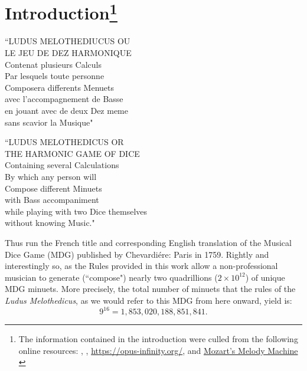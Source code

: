 \documentclass[a4paper,x11names,svgnames,10pt]{article}
\begin{document}
{\section[Introduction]{Introduction\footnote{The information contained in the introduction were culled from the following online resources:
	\citet{ac1802}, 
	\citet{wiki_mw2017},
	\url{https://opus-infinity.org/}, and 
	\href{https://www.sciencenews.org/article/mozarts-melody-machine-0}{Mozart's Melody Machine} \citep*{peterson2001}
	}
}
	\begin{center}
	\begin{minipage}{0.4\textwidth}
	\begin{flushleft}
		\begin{center}
			``\small LUDUS MELOTHEDIUCUS OU \\ LE JEU DE DEZ HARMONIQUE \\
			Contenat plusieurs Calculs \\
			Par lesquels toute personne \\ Composera differents Menuets \\ 
			avec l'accompagnement de Basse  \\
			en jouant avec de deux Dez meme  \\
			sans scavior la Musique"
		\end{center}
	\end{flushleft}
	\end{minipage}
	\begin{minipage}{0.4\textwidth}
	\begin{flushright}
		\begin{center}
		``\small LUDUS MELOTHEDICUS OR \\ THE HARMONIC GAME OF DICE \\
		Containing several Calculations \\ 
		By which any person will \\
		Compose different Minuets \\ 
		with Bass accompaniment \\
		while playing with two Dice themselves \\ 
		without knowing Music."
	\end{center}
	\end{flushright}
	\end{minipage}
	\end{center}

Thus run the French title and corresponding English translation of the Musical Dice Game (MDG) published by Chevardi\'{e}re: Paris in 1759.  Rightly and interestingly so, as the Rules provided in this work allow a non-professional musician to generate (``compose") nearly two quadrillions ($2 \times 10^{12}$) of unique MDG minuets.  More precisely, the total number of minuets that the rules of the {\it Ludus Melothedicus}, as we would refer to this MDG from here onward, yield is: $$9^{16} = 1\!,853\!,020\!,188\!,851\!,841.$$ 

}
\end{document}

